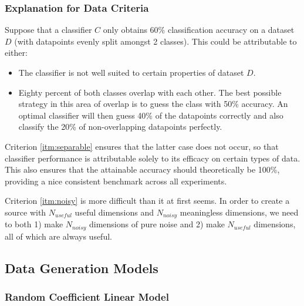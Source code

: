 \documentclass{article}
\begin{document}
\subsubsection*{Explanation for Data Criteria}

Suppose that a classifier $C$ only obtains 60\% classification accuracy on a
dataset $D$ (with datapoints evenly split amongst 2 classes). This could be
attributable to either:
\begin{itemize}
    \item The classifier is not well suited to certain properties of dataset
        $D$.
    \item Eighty percent of both classes overlap with each other. The best
        possible strategy in this area of overlap is to guess the class with
        50\% accuracy. An optimal classifier will then guess 40\% of the
        datapoints correctly and also classify the 20\% of non-overlapping
        datapoints perfectly.
\end{itemize}
Criterion \ref{itm:separable} ensures that the latter case does not occur,
so that classifier performance is attributable solely to its efficacy on
certain types of data. This also ensures that the attainable accuracy should
theoretically be 100\%, providing a nice consistent benchmark across all
experiments.

Criterion \ref{itm:noisy} is more difficult than it at first seems. In
order to create a source with $N_{useful}$ useful dimensions and $N_{noisy}$
meaningless dimensions, we need to both 1) make $N_{noisy}$ dimensions of
pure noise and 2) make $N_{useful}$ dimensions, all of which are always useful.



\subsection*{Data Generation Models}

\subsubsection*{Random Coefficient Linear Model}
\end{document}

